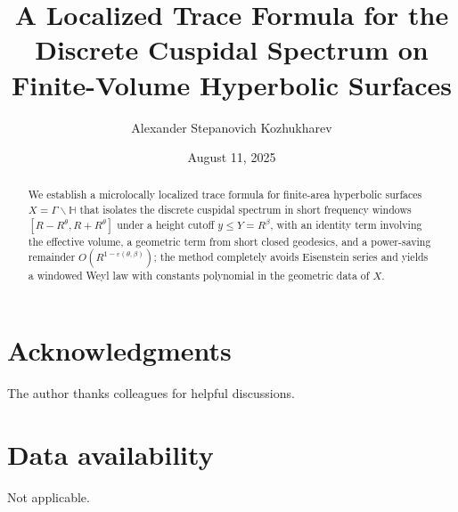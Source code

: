 \documentclass[12pt]{amsart}
\title[A Localized Trace Formula]{A Localized Trace Formula for the Discrete Cuspidal Spectrum on Finite-Volume Hyperbolic Surfaces}
\author{Alexander Stepanovich Kozhukharev}
\date{August 11, 2025}
\numberwithin{equation}{section}
\theoremstyle{plain}
\theoremstyle{definition}
\theoremstyle{remark}
\newcommand{\HH}{\mathbb{H}}
\begin{document}
\begin{abstract}
We establish a microlocally localized trace formula for finite-area hyperbolic surfaces $X=\Gamma\backslash\HH$ that isolates the discrete cuspidal spectrum in short frequency windows $[R-R^\theta,R+R^\theta]$ under a height cutoff $y\le Y=R^\beta$, with an identity term involving the effective volume, a geometric term from short closed geodesics, and a power-saving remainder $O(R^{1-\varepsilon(\theta,\beta)})$; the method completely avoids Eisenstein series and yields a windowed Weyl law with constants polynomial in the geometric data of $X$.
\end{abstract}


\maketitle

\tableofcontents







\section*{Acknowledgments}
The author thanks colleagues for helpful discussions.

\section*{Data availability}
Not applicable.



\end{document}
